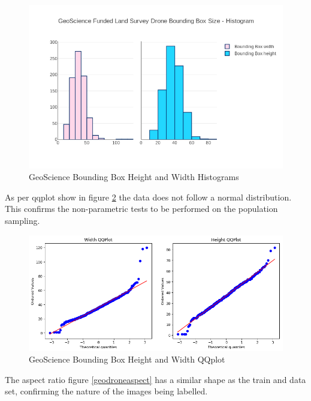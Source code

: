 \documentclass{article}
\begin{document}
\begin{figure}[ht]
\centering
\label{geodronethist}
\includegraphics[scale=0.4]{images/geoscience-histogram.png}
\caption{GeoScience Bounding Box Height and Width Histograms}
\end{figure}

As per qqplot show in figure \ref{geodroneqqplot} the data does not follow a normal distribution. This confirms the non-parametric tests to be performed on the population sampling.

\begin{figure}[h]
\centering
\label{geodroneqqplot}
\includegraphics[scale=0.4]{images/geoscience-qqplot.png}
\caption{GeoScience Bounding Box Height and Width QQplot}
\end{figure}

The aspect ratio figure \ref{geodroneaspect} has a similar shape as the train and data set, confirming the nature of the images being labelled. 
\end{document}

